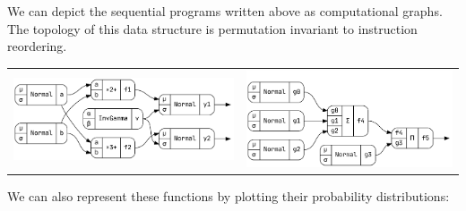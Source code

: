 \documentclass[landscape,a0b,final,a4resizeable]{a0poster}
\newenvironment{poster}{
\begin{center}
\begin{minipage}[c]{0.96\textwidth}
}{
\end{minipage}
\end{center}
}
\theoremstyle{definition}
\theoremstyle{remark}
\begin{document}
\begin{poster}
\begin{multicols}{3}
\vspace{\baselineskip}

We can depict the sequential programs written above as computational graphs. The topology of this data structure is permutation invariant to instruction reordering.

\vspace{\baselineskip}

\begin{tabular}{cc}
\begin{minipage}[c]{0.5\columnwidth}
\centering
\includegraphics[width=\columnwidth]{bayesLR.png}
\end{minipage}
&
\begin{minipage}[c]{0.5\columnwidth}
\centering
\includegraphics[width=\columnwidth]{bayesR.png}
\end{minipage}
\end{tabular}

\vspace{\baselineskip}

We can also represent these functions by plotting their probability distributions:

\vspace{\baselineskip}


\end{multicols}
\end{poster}
\end{document}
